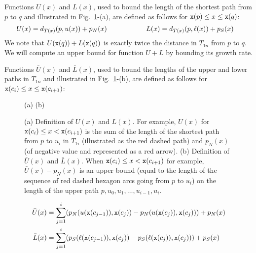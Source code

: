 \documentclass[11pt,USenglish]{article}
\theoremstyle{plain}%
\theoremstyle{definition}
\begin{document}
{Functions $U(x)$ and $L(x)$, used to bound the length of the shortest path from $p$ to $q$ and illustrated in Fig.~\ref{fig:UandL}-(a), are defined as follows for ${\tt x}(p) \leq x \leq {\tt x}(q)$:
\begin{align*}
& U(x) = d_{T(x)}(p,u(x)) + p_N(x) \mbox{\hspace{2cm}} L(x) = d_{T(x)}(p,\ell(x)) + p_S(x)
\end{align*}
We note that $U({\tt x}(q))+L({\tt x}(q))$ is exactly twice the distance in 
$T_{1n}$ from $p$ to $q$. We will compute an upper bound for function $U+L$ 
by bounding its growth rate.

Functions ${\bar U}(x)$ and ${\bar L}(x)$, used to bound the lengths of the upper and lower paths in $T_{1n}$ and illustrated in Fig.~\ref{fig:UandL}-(b), are defined as follows for ${\tt x}(c_i) \leq x \leq {\tt x}(c_{i+1})$:

\begin{figure}[!b]
\begin{center}\UandL

(a) \hspace{6cm} (b)
\end{center}
\caption{(a) Definition of $U(x)$ and $L(x)$. For example, $U(x)$ for 
${\tt x}(c_i) \leq x < {\tt x}(c_{i+1})$ is the sum
of the length of the shortest path from $p$ to $u_i$ in $T_{1i}$ 
(illustrated as the red dashed path) and $p_N(x)$ (of negative value and 
represented as a red arrow). (b) Definition of $\bar{U}(x)$ and $\bar{L}(x)$. 
When ${\tt x}(c_i) \leq x < {\tt x}(c_{i+1})$ for example,
$\bar{U}(x) - p_N(x)$ is an upper bound (equal to the length of the 
sequence of red dashed
hexagon arcs going from $p$ to $u_i$) on the length
of the upper path $p, u_0, u_1, \dots, u_{i-1}, u_i$.}
\label{fig:UandL}
\end{figure}


\begin{align*}
\bar{U}(x) & = \sum_{j=1}^{i} (p_N(u({\tt x}(c_{j-1})), {\tt x}(c_{j})) - p_N(u({\tt x}(c_{j})),{\tt x}(c_{j}))) + p_N(x) \\
\bar{L}(x) & = \sum_{j=1}^{i} (p_S(\ell({\tt x}(c_{j-1})), {\tt x}(c_{j})) - p_S(\ell({\tt x}(c_{j})),{\tt x}(c_{j}))) + p_S(x)
\end{align*}



}
\end{document}
